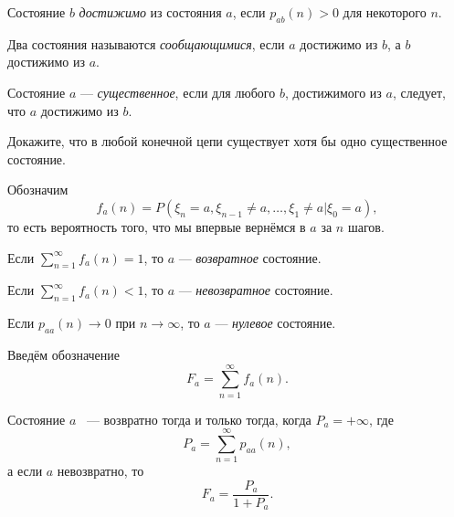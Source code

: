  \begin{definition}
     Состояние $b$ \textit{достижимо} из состояния $a$, если $p_{ab}(n) > 0 $ для некоторого $n$.

     Два состояния называются \textit{сообщающимися}, если $a$ достижимо из $b$, а $b$ достижимо из $a$.

     Состояние $a$ --- \textit{существенное}, если для любого $b$, достижимого из $a$, следует, что $a$ достижимо из $b$.
 \end{definition}

 \begin{exercise}
     Докажите, что в любой конечной цепи существует хотя бы одно существенное состояние.
 \end{exercise}

 Обозначим 
 $$f_a(n)= P(\xi_n = a, \xi_{n - 1}\neq a, \ldots, \xi_1\neq a| \xi_0 = a),$$ то есть вероятность того, что мы впервые вернёмся в $a$ за $n$ шагов.

 \begin{definition}
     Если $\sum_{n = 1}^{\infty}f_a(n) = 1$, то $a$ --- \textit{возвратное} состояние.

     Если $\sum_{n = 1}^{\infty}f_a(n) < 1$, то $a$ --- \textit{невозвратное} состояние.
 \end{definition}

 \begin{definition}
     Если $p_{aa}(n) \to 0$ при $n \to \infty$, то $a$ --- \textit{нулевое} состояние.
 \end{definition}

Введём обозначение
     $$F_a = \sum \limits_{n = 1}^{\infty}f_a(n).$$


 \begin{theorem}
     Состояние $a$ ~--- возвратно тогда и только тогда, когда $P_a = +\infty$, где 
     $$P_a = \sum \limits_{n = 1}^{\infty}p_{aa}(n),$$ а если $a$ невозвратно, то 
     $$F_a = \frac{P_a}{1+P_a}.$$
 \end{theorem}


